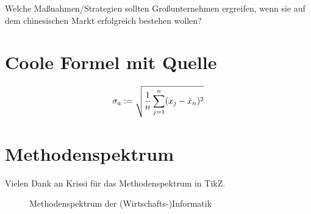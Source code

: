 	\vspace{1cm}
	
	\begin{UmgebungForschungsfrage}[Gestaltung]
		Welche Maßnahmen/Strategien sollten Großunternehmen ergreifen, wenn sie auf dem chinesischen Markt erfolgreich bestehen wollen?
	\end{UmgebungForschungsfrage}


	\section{Coole Formel mit Quelle}
	\begin{equation}\label{eq:arithStand}
		\sigma _{a} := \sqrt{\frac{1}{n}\sum^n_{j=1}(x_j-\bar x_{n})^2}
		\vadjust{\smallskip \hbox to \linewidth{\hfill\autocite[vgl. ][21]{henzeStochastikFuerEinsteiger.2021}}}
	\end{equation} 

	\section{Methodenspektrum}
	Vielen Dank an Krissi für das Methodenspektrum in TikZ.
	\begin{figure}[h]
		\centering
		\resizebox{0.65\linewidth}{!}{%
			
		}
		\caption{\label{fig:Methodenspektrum} Methodenspektrum der (Wirtschafts-)Informatik \autocite[vgl.][14]{wildeMethodenspektrumWirtschaftsinformatikUeberblick.2006}}
	\end{figure}